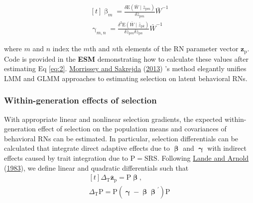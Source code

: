 \documentclass{article}
\begin{document}
\begin{equation} \tag{3}\label{eq:3}
\begin{gathered}[t]
\upbeta _m = \frac{ \delta \mathrm{E} \left( \bar{W} \mid \bar{z}_{\mathrm{p}m}  \right) }{ \delta \bar{z}_{\mathrm{p}m} }  \bar{W}^{-1} \\
\upgamma _{m,n} = \frac{ \delta^2 \mathrm{E} \left( \bar{W} \mid \bar{z}_{\mathrm{p}k}  \right) }{ \delta \bar{z}_{\mathrm{p}m} \delta \bar{z}_{\mathrm{p}n} }  \bar{W}^{-1} \nonumber
\end{gathered}
\end{equation}

where \(m\) and \(n\) index the \(m\)th and \(n\)th elements of the RN
parameter vector \(\boldsymbol{z}_{\boldsymbol{\mathrm{p}}}\). Code is
provided in the \textbf{ESM} demonstrating how to calculate these values
after estimating Eq \ref{eq:2}.
\protect\hyperlink{ref-Morrissey2013}{Morrissey and Sakrejda}
(\protect\hyperlink{ref-Morrissey2013}{2013}) 's method elegantly
unifies LMM and GLMM approaches to estimating selection on latent
behavioral RNs.

\hypertarget{within-generation-effects-of-selection}{%
\subsubsection{Within-generation effects of
selection}\label{within-generation-effects-of-selection}}

With appropriate linear and nonlinear selection gradients, the expected
within-generation effect of selection on the population means and
covariances of behavioral RNs can be estimated. In particular, selection
differentials can be calculated that integrate direct adaptive effects
due to \(\boldsymbol{ \upbeta}\) and \(\boldsymbol{ \upgamma }\) with
indirect effects caused by trait integration due to
\(\boldsymbol{\mathrm{P}}=\boldsymbol{\mathrm{S}}\boldsymbol{\mathrm{R}}\boldsymbol{\mathrm{S}}\).
Following \protect\hyperlink{ref-Lande1983}{Lande and Arnold}
(\protect\hyperlink{ref-Lande1983}{1983}), we define linear and
quadratic differentials such that
\begin{equation} \tag{4.1}\label{eq:4.1}
\begin{gathered}[t]
\Delta_{\mathrm{T}} \bar{\boldsymbol{z}}_{\boldsymbol{\mathrm{p}}} =
\boldsymbol{\mathrm{P}} \boldsymbol{\upbeta}, \\ 
\Delta_{\mathrm{T}} \boldsymbol{\mathrm{P}} = \boldsymbol{\mathrm{P}} \left( \boldsymbol{\upgamma} - \boldsymbol{ \upbeta \upbeta }^{'} \right) \boldsymbol{\mathrm{P}} \nonumber
\end{gathered}
\end{equation}
\end{document}
